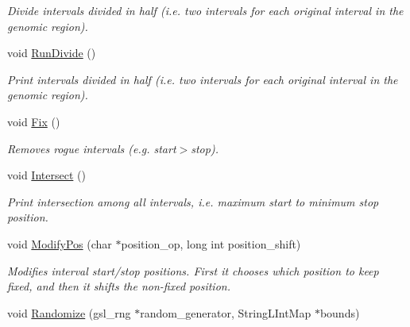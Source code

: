 \begin{CompactItemize}
\begin{CompactList}\small\item\em Divide intervals divided in half (i.e. two intervals for each original interval in the genomic region). \item\end{CompactList}\item 
\hypertarget{classGenomicRegionBED_5f456b4af154c98968370568828d6e3d}{
void \hyperlink{classGenomicRegionBED_5f456b4af154c98968370568828d6e3d}{RunDivide} ()}
\label{classGenomicRegionBED_5f456b4af154c98968370568828d6e3d}

\begin{CompactList}\small\item\em Print intervals divided in half (i.e. two intervals for each original interval in the genomic region). \item\end{CompactList}\item 
\hypertarget{classGenomicRegionBED_ac069dcf513265f7756b72c106f2765c}{
void \hyperlink{classGenomicRegionBED_ac069dcf513265f7756b72c106f2765c}{Fix} ()}
\label{classGenomicRegionBED_ac069dcf513265f7756b72c106f2765c}

\begin{CompactList}\small\item\em Removes rogue intervals (e.g. start$>$stop). \item\end{CompactList}\item 
\hypertarget{classGenomicRegionBED_cf815a65712e82bf3f8c596c795f55c4}{
void \hyperlink{classGenomicRegionBED_cf815a65712e82bf3f8c596c795f55c4}{Intersect} ()}
\label{classGenomicRegionBED_cf815a65712e82bf3f8c596c795f55c4}

\begin{CompactList}\small\item\em Print intersection among all intervals, i.e. maximum start to minimum stop position. \item\end{CompactList}\item 
void \hyperlink{classGenomicRegionBED_c515c70f443db400f911452ed359433b}{ModifyPos} (char $\ast$position\_\-op, long int position\_\-shift)
\begin{CompactList}\small\item\em Modifies interval start/stop positions. First it chooses which position to keep fixed, and then it shifts the non-fixed position. \item\end{CompactList}\item 
\hypertarget{classGenomicRegionBED_920d47deb095506c311da2b2324e7a14}{
void \hyperlink{classGenomicRegionBED_920d47deb095506c311da2b2324e7a14}{Randomize} (gsl\_\-rng $\ast$random\_\-generator, StringLIntMap $\ast$bounds)}
\label{classGenomicRegionBED_920d47deb095506c311da2b2324e7a14}


\end{CompactItemize}
